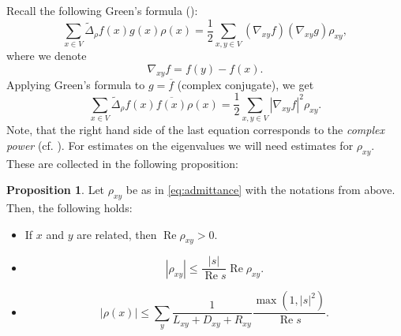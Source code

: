 \documentclass[a4paper,11pt]{amsart}
\theoremstyle{definition}
\newtheorem{proposition}[theorem]{Proposition}
\renewcommand{\Re}{\operatorname{Re}}%
\begin{document}
Recall the following Green's formula (\cite{Muranova1, MuranovaThesis}):
\begin{equation}\label{Green}
\sum_{x\in V}\widetilde \Delta_\rho f(x)g(x)\rho(x)=\dfrac{1}{2}\sum_{x,y\in V}(\nabla_{xy}f)(\nabla_{xy}g)\rho_{xy},
\end{equation}
where we denote
\begin{equation*}
\nabla_{xy}f=f(y)-f(x).
\end{equation*}
Applying Green's formula to $g=\overline f$ (complex conjugate), we get
\begin{equation}\label{energy}
\sum_{x\in V}\widetilde \Delta_\rho f(x)\overline{f(x)}\rho(x)=\dfrac{1}{2}\sum_{x,y\in V}|\nabla_{xy}f|^2\rho_{xy}.
\end{equation}
Note, that the right hand side of the last equation corresponds to the \emph{complex power} (cf. \cite{AlonsoRuiz, Baez, ChenTeplyaev, MuranovaThesis}).
For estimates on the eigenvalues we will need estimates for $\rho_{xy}$. These are collected in the following proposition:
\begin{proposition}\label{prop:Rerho}
Let $\rho_{xy}$ be as in \eqref{eq:admittance} with the notations from above. Then, the following holds:
\begin{itemize}
\item[1.] If $x$ and $y$ are related, then $\Re \rho_{xy} > 0$. 
\item[2.] 
\begin{equation}
\label{eq:EstimateModulusAdmittance}
| \rho_{xy} | \leq \frac{|s|}{\Re s} \Re \rho_{xy}.
\end{equation}
\item[3.]
\begin{equation}
\label{eq:EstimateModulusRho}
| \rho(x)| \leq \sum_y \frac{1}{L_{xy} + D_{xy} + R_{xy}} \frac{\max(1,|s|^2)}{\Re s} .
\end{equation}
\end{itemize}
\end{proposition}
\end{document}
